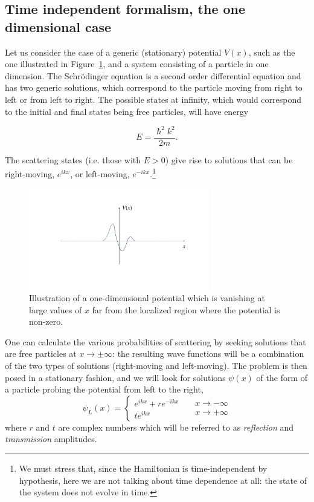 \subsection{Time independent formalism, the one dimensional case}

Let us consider the case of a generic (stationary) potential $V(x)$, such as the one illustrated in Figure~\ref{fig:potential-1}, and a system consisting of a particle in one dimension. The  Schr\"odinger equation is a second order differential equation and has two generic solutions, which correspond to the particle moving from right to left or from left to right. The possible states at infinity, which would correspond to the initial and final states being free particles, will have energy

\[ E = \frac{\hslash^2 k^2}{2m}.\]

The scattering states (i.e. those with $E>0$) give rise to solutions that can be right-moving, $e^{ikx}$, or left-moving, $e^{-ikx}$.\footnote{We must stress that, since the Hamiltonian is time-independent by hypothesis, here we are not talking about time dependence at all: the state of the system does not evolve in time.}

    \begin{figure}
        \includegraphics[width=0.7\textwidth]{Figures/Potential-1}
        \caption{Illustration of a one-dimensional potential which is vanishing at large values of $x$ far from the localized region where the potential is non-zero.}
        \label{fig:potential-1}
    \end{figure}


One can calculate the various probabilities of scattering by seeking solutions that are free particles at $x \rightarrow \pm \infty$: the resulting wave functions will be a combination of the two types of solutions (right-moving and left-moving). The problem is then posed in a stationary fashion, and we will look for solutions $\psi(x)$ of the form of a particle probing the potential from left to the right,
\begin{equation}
\psi_L(x) = \left \{ 
    \begin{matrix}
 e^{ikx} + r e^{-ikx}  \\
 t e^{ikx} 
\end{matrix}
    \right . \; \; \; \; 
    \begin{matrix}
 x \rightarrow -\infty  \\
 x \rightarrow +\infty 
\end{matrix}
\end{equation}
where $r$ and $t$ are complex numbers which will be referred to as {\it reflection} and {\it transmission} amplitudes. 

